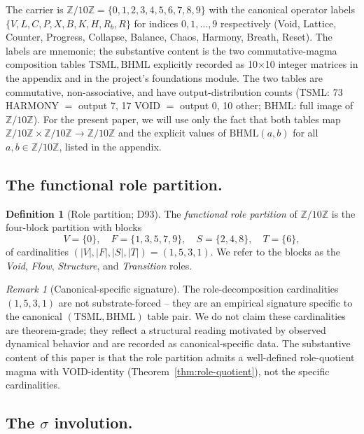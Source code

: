 \documentclass[11pt,reqno]{amsart}
\theoremstyle{plain}
\theoremstyle{definition}
\newtheorem{definition}[theorem]{Definition}
\theoremstyle{remark}
\newtheorem*{remark}{Remark}
\newcommand{\Z}{\mathbb{Z}}
\newcommand{\TS}{\mathrm{TSML}}
\newcommand{\BH}{\mathrm{BHML}}
\begin{document}
The carrier is $\Z/10\Z = \{0, 1, 2, 3, 4, 5, 6, 7, 8, 9\}$ with the
canonical operator labels $\{V, L, C, P, X, B, K, H, R_b, R\}$ for
indices $0, 1, \ldots, 9$ respectively (Void, Lattice, Counter,
Progress, Collapse, Balance, Chaos, Harmony, Breath, Reset). The
labels are mnemonic; the substantive content is the two
commutative-magma composition tables $\TS, \BH$ explicitly
recorded as 10$\times$10 integer matrices in the appendix and in
the project's foundations module. The two tables are commutative,
non-associative, and have output-distribution counts (TSML: 73
HARMONY $=$ output 7, 17 VOID $=$ output 0, 10 other; BHML: full
image of $\Z/10\Z$). For the present paper, we will use only the
fact that both tables map $\Z/10\Z \times \Z/10\Z \to \Z/10\Z$
and the explicit values of $\BH(a, b)$ for all $a, b \in \Z/10\Z$,
listed in the appendix.

\subsection{The functional role partition.}

\begin{definition}[Role partition; D93] \label{def:roles}
The \emph{functional role partition} of $\Z/10\Z$ is the four-block
partition with blocks
\[
V = \{0\}, \quad
F = \{1, 3, 5, 7, 9\}, \quad
S = \{2, 4, 8\}, \quad
T = \{6\},
\]
of cardinalities $(|V|, |F|, |S|, |T|) = (1, 5, 3, 1)$. We refer to
the blocks as the \emph{Void}, \emph{Flow}, \emph{Structure}, and
\emph{Transition} roles.
\end{definition}

\begin{remark}[Canonical-specific signature]
The role-decomposition cardinalities $(1, 5, 3, 1)$ are not
substrate-forced -- they are an empirical signature specific to the
canonical $(\TS, \BH)$ table pair. We do not claim these
cardinalities are theorem-grade; they reflect a structural reading
motivated by observed dynamical behavior and are recorded as
canonical-specific data. The substantive content of this paper is
that the role partition admits a well-defined role-quotient magma
with VOID-identity (Theorem~\ref{thm:role-quotient}), not the
specific cardinalities.
\end{remark}

\subsection{The $\sigma$ involution.} \label{ssec:sigma}
\end{document}
